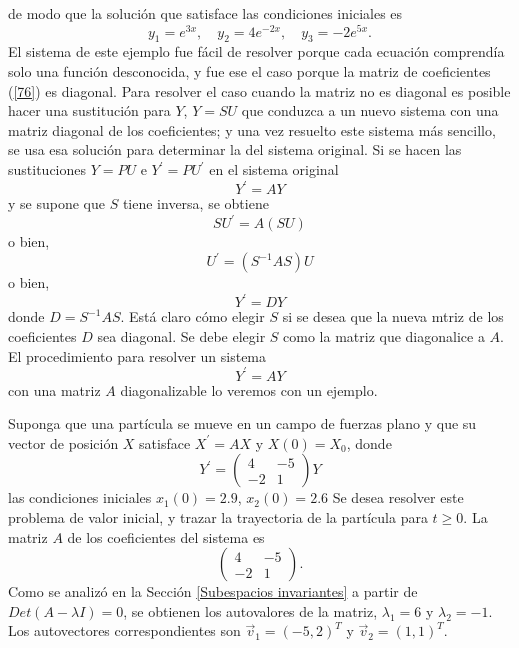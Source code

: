   de modo que la solución que satisface las condiciones iniciales es
  \[
  y_1=e^{3x}, \quad y_2=4e^{-2x},  \quad y_3=-2e^{5x}.
  \]
 El sistema de este ejemplo fue fácil de resolver porque cada ecuación comprendía solo una función desconocida, y fue ese el caso porque la matriz de coeficientes  (\ref{76}) es diagonal. 
 Para resolver el caso cuando la matriz no es diagonal es posible hacer una sustitución para $Y$, $Y=SU$ que conduzca a un nuevo sistema con una matriz diagonal de los coeficientes; y una vez resuelto este sistema más sencillo, se usa esa solución para determinar la del sistema original.
 Si se hacen las sustituciones $Y=PU$ e $Y^\prime=PU^\prime$ en el sistema original 
   \[
  Y^\prime=AY
  \]
  y se supone que $S$ tiene inversa, se obtiene 
  \[
  SU^\prime=A(SU)
  \]
  o bien, 
  \[
  U^\prime=(S^{-1}AS)U
  \]
  o bien,
  \[
  Y^\prime=DY
  \]
  donde $D=S^{-1}AS$. Está claro cómo elegir $S$ si se desea que la nueva mtriz de los coeficientes $D$ sea diagonal. Se debe elegir $S$ como la matriz que diagonalice a $A$.
  El procedimiento para resolver un sistema 
  \[
  Y^\prime=AY
  \]
 con una matriz $A$ diagonalizable lo veremos con un ejemplo.
  
Suponga que una partícula se mueve en un campo de fuerzas plano y que
su vector de posición $X$ satisface $X^\prime	 = AX$  y $X(0) = X_0$, donde
\[
  Y^\prime=\left(\begin{array}{cc} 4 & -5  \\-2 & 1 
\end{array}
 \right)Y
  \]
las condiciones iniciales $x_1(0)=2$.$9$, $x_2(0)= 2$.$6$
Se desea resolver este problema de valor inicial, y trazar la trayectoria de la partícula para $t \ge 0$.
La matriz $A$ de los coeficientes del sistema es 
\[
 \left(\begin{array}{cc} 4 & -5  \\-2 & 1 
\end{array}
 \right).
  \]
 Como se analizó en la Sección \ref{Subespacios invariantes}
 a partir de $Det(A-\lambda I)=0$, se obtienen los autovalores de la matriz, $\lambda_1= 6$ y $\lambda_2= -1$. Los autovectores correspondientes son $\Vec{v}_1=(-5,2)^T$ y $\Vec{v}_2=(1,1)^T$.
 
